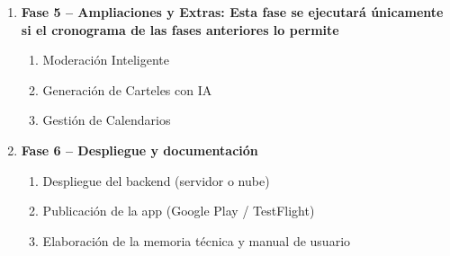 \documentclass[12pt]{article}
\begin{document}
\begin{enumerate}
\begin{enumerate}
\item Pruebas de integración (API + app)

\item Pruebas de usabilidad con usuarios reales

\item Corrección de errores y mejoras

\end{enumerate}

\item \textbf{Fase 5 – Ampliaciones y Extras: Esta fase se ejecutará únicamente si el cronograma de las fases anteriores lo permite}

\begin{enumerate}

\item Moderación Inteligente

\item Generación de Carteles con IA

\item Gestión de Calendarios

\end{enumerate}

\item \textbf{Fase 6 – Despliegue y documentación}

\begin{enumerate}

\item Despliegue del backend (servidor o nube)

\item Publicación de la app (Google Play / TestFlight)

\item Elaboración de la memoria técnica y manual de usuario

\end{enumerate}

\end{enumerate}
\end{document}
